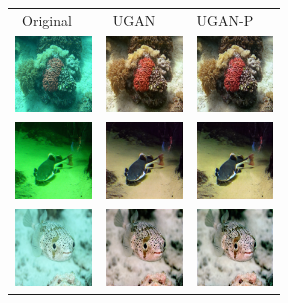 \documentclass[letterpaper, 10pt, conference]{ieeeconf}
\begin{document}
\begin{figure}
\centering
\begin{tabular}{p{1.7cm} p{1.7cm} p{1.7cm}}

   ~\quad Original & ~\quad UGAN & \quad UGAN-P \\

   \includegraphics[width=0.8in]{n01917289_4982_real} &
   \includegraphics[width=0.8in]{n01917289_4982_gen_0} &
   \includegraphics[width=0.8in]{n01917289_4982_gen_1} \\

   \includegraphics[width=0.8in]{n01496331_16340_real} &
   \includegraphics[width=0.8in]{n01496331_16340_gen_0} &
   \includegraphics[width=0.8in]{n01496331_16340_gen_1} \\
   
   \includegraphics[width=0.8in]{n01496331_22183_real} &
   \includegraphics[width=0.8in]{n01496331_22183_gen_0} &
   \includegraphics[width=0.8in]{n01496331_22183_gen_1} \\
   

\end{tabular}
\end{figure}
\end{document}
